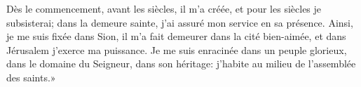 Dès le commencement, avant les siècles, il m’a créée,
	et pour les siècles je subsisterai;
	dans la demeure sainte, j’ai assuré mon service en sa présence.
Ainsi, je me suis fixée dans Sion,
	il m’a fait demeurer dans la cité bien-aimée,
	et dans Jérusalem j’exerce ma puissance.
Je me suis enracinée dans un peuple glorieux,
	dans le domaine du Seigneur, dans son héritage:
	j’habite au milieu de l’assemblée des saints.»
